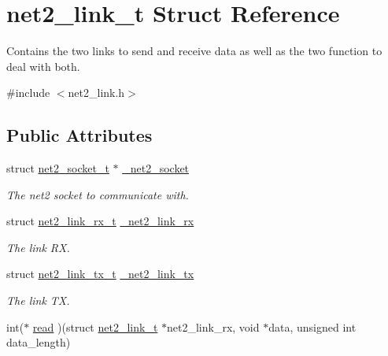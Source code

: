 \hypertarget{structnet2__link__t}{}\section{net2\+\_\+link\+\_\+t Struct Reference}
\label{structnet2__link__t}


Contains the two links to send and receive data as well as the two function to deal with both.  




{\ttfamily \#include $<$net2\+\_\+link.\+h$>$}

\subsection*{Public Attributes}
\begin{DoxyCompactItemize}
\item 
\hypertarget{structnet2__link__t_a8f65f2ed0fbce1980d459461be98b761}{}struct \hyperlink{structnet2__socket__t}{net2\+\_\+socket\+\_\+t} $\ast$ \hyperlink{structnet2__link__t_a8f65f2ed0fbce1980d459461be98b761}{\+\_\+net2\+\_\+socket}\label{structnet2__link__t_a8f65f2ed0fbce1980d459461be98b761}

\begin{DoxyCompactList}\small\item\em The net2 socket to communicate with. \end{DoxyCompactList}\item 
\hypertarget{structnet2__link__t_ad80d872bae84888fec67048269d55a4b}{}struct \hyperlink{structnet2__link__rx__t}{net2\+\_\+link\+\_\+rx\+\_\+t} \hyperlink{structnet2__link__t_ad80d872bae84888fec67048269d55a4b}{\+\_\+net2\+\_\+link\+\_\+rx}\label{structnet2__link__t_ad80d872bae84888fec67048269d55a4b}

\begin{DoxyCompactList}\small\item\em The link R\+X. \end{DoxyCompactList}\item 
\hypertarget{structnet2__link__t_a4c167a94d5b5be0e8ecd8d719ba72bcd}{}struct \hyperlink{structnet2__link__tx__t}{net2\+\_\+link\+\_\+tx\+\_\+t} \hyperlink{structnet2__link__t_a4c167a94d5b5be0e8ecd8d719ba72bcd}{\+\_\+net2\+\_\+link\+\_\+tx}\label{structnet2__link__t_a4c167a94d5b5be0e8ecd8d719ba72bcd}

\begin{DoxyCompactList}\small\item\em The link T\+X. \end{DoxyCompactList}\item 
\hypertarget{structnet2__link__t_a09223d3a820594bf3082acfae22b1a7f}{}int($\ast$ \hyperlink{structnet2__link__t_a09223d3a820594bf3082acfae22b1a7f}{read} )(struct \hyperlink{structnet2__link__t}{net2\+\_\+link\+\_\+t} $\ast$net2\+\_\+link\+\_\+rx, void $\ast$data, unsigned int data\+\_\+length)\label{structnet2__link__t_a09223d3a820594bf3082acfae22b1a7f}


\end{DoxyCompactItemize}
